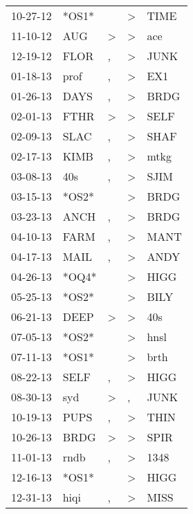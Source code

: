 \begin{supertabular}{lllll}
 10-27-12 &  *OS1* &               &     \textgreater &   TIME \\
 11-10-12 &    AUG &  \textgreater &     \textgreater &    ace \\
 12-19-12 &   FLOR &             , &     \textgreater &   JUNK \\
 01-18-13 &   prof &             , &     \textgreater &    EX1 \\
 01-26-13 &   DAYS &             , &     \textgreater &   BRDG \\
 02-01-13 &   FTHR &  \textgreater &     \textgreater &   SELF \\
 02-09-13 &   SLAC &             , &     \textgreater &   SHAF \\
 02-17-13 &   KIMB &             , &     \textgreater &   mtkg \\
 03-08-13 &    40s &             , &     \textgreater &   SJIM \\
 03-15-13 &  *OS2* &               &     \textgreater &   BRDG \\
 03-23-13 &   ANCH &             , &     \textgreater &   BRDG \\
 04-10-13 &   FARM &             , &     \textgreater &   MANT \\
 04-17-13 &   MAIL &             , &     \textgreater &   ANDY \\
 04-26-13 &  *OQ4* &               &     \textgreater &   HIGG \\
 05-25-13 &  *OS2* &               &     \textgreater &   BILY \\
 06-21-13 &   DEEP &  \textgreater &     \textgreater &    40s \\
 07-05-13 &  *OS2* &               &     \textgreater &   hnsl \\
 07-11-13 &  *OS1* &               &     \textgreater &   brth \\
 08-22-13 &   SELF &             , &     \textgreater &   HIGG \\
 08-30-13 &    syd &  \textgreater &                , &   JUNK \\
 10-19-13 &   PUPS &             , &     \textgreater &   THIN \\
 10-26-13 &   BRDG &  \textgreater &     \textgreater &   SPIR \\
 11-01-13 &   rndb &             , &     \textgreater &   1348 \\
 12-16-13 &  *OS1* &               &     \textgreater &   HIGG \\
 12-31-13 &   hiqi &             , &     \textgreater &   MISS \\

\end{supertabular}
